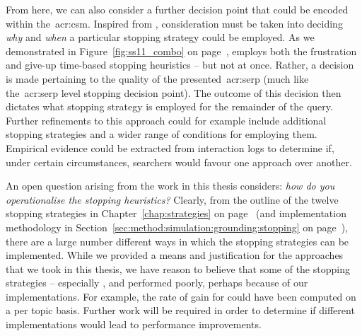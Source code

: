 From here, we can also consider a further decision point that could be encoded within the~\gls{acr:csm}. Inspired from , consideration must be taken into deciding \emph{why} and \emph{when} a particular stopping strategy could be employed. As we demonstrated in Figure~\ref{fig:ss11_combo} on page~\pageref{fig:ss11_combo},  employs both the frustration and give-up time-based stopping heuristics -- but not at once. Rather, a decision is made pertaining to the quality of the presented~\gls{acr:serp} (much like the~\gls{acr:serp} level stopping decision point). The outcome of this decision then dictates what stopping strategy is employed for the remainder of the query. Further refinements to this approach could for example include additional stopping strategies and a wider range of conditions for employing them. Empirical evidence could be extracted from interaction logs to determine if, under certain circumstances, searchers would favour one approach over another.

An open question arising from the work in this thesis considers: \emph{how do you operationalise the stopping heuristics?} Clearly, from the outline of the twelve stopping strategies in Chapter~\ref{chap:strategies} on page~\pageref{chap:strategies} (and implementation methodology in Section~\ref{sec:method:simulation:grounding:stopping} on page~\pageref{sec:method:simulation:grounding:stopping}), there are a large number different ways in which the stopping strategies can be implemented. While we provided a means and justification for the approaches that we took in this thesis, we have reason to believe that some of the stopping strategies -- especially ,  and  performed poorly, perhaps because of our implementations. For example, the rate of gain for  could have been computed on a per topic basis. Further work will be required in order to determine if different implementations would lead to performance improvements.

